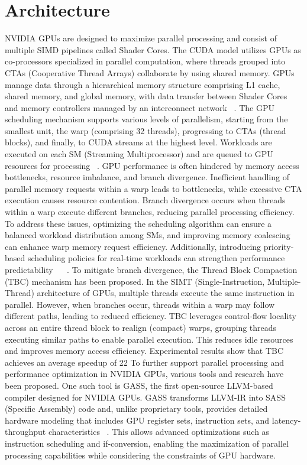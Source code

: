 \section{Architecture}
NVIDIA GPUs are designed to maximize parallel processing and consist of multiple SIMD pipelines called Shader Cores. The CUDA model utilizes GPUs as co-processors specialized in parallel computation, where threads grouped into CTAs (Cooperative Thread Arrays) collaborate by using shared memory. GPUs manage data through a hierarchical memory structure comprising L1 cache, shared memory, and global memory, with data transfer between Shader Cores and memory controllers managed by an interconnect network ~\cite{Bakhoda2009}. The GPU scheduling mechanism supports various levels of parallelism, starting from the smallest unit, the warp (comprising 32 threads), progressing to CTAs (thread blocks), and finally, to CUDA streams at the highest level. Workloads are executed on each SM (Streaming Multiprocessor) and are queued to GPU resources for processing ~\cite{Sanudo2020}.
GPU performance is often hindered by memory access bottlenecks, resource imbalance, and branch divergence. Inefficient handling of parallel memory requests within a warp leads to bottlenecks, while excessive CTA execution causes resource contention. Branch divergence occurs when threads within a warp execute different branches, reducing parallel processing efficiency. To address these issues, optimizing the scheduling algorithm can ensure a balanced workload distribution among SMs, and improving memory coalescing can enhance warp memory request efficiency. Additionally, introducing priority-based scheduling policies for real-time workloads can strengthen performance predictability ~\cite{Bakhoda2009} ~\cite{Sanudo2020}.
To mitigate branch divergence, the Thread Block Compaction (TBC) mechanism has been proposed. In the SIMT (Single-Instruction, Multiple-Thread) architecture of GPUs, multiple threads execute the same instruction in parallel. However, when branches occur, threads within a warp may follow different paths, leading to reduced efficiency. TBC leverages control-flow locality across an entire thread block to realign (compact) warps, grouping threads executing similar paths to enable parallel execution. This reduces idle resources and improves memory access efficiency. Experimental results show that TBC achieves an average speedup of 22%
To further support parallel processing and performance optimization in NVIDIA GPUs, various tools and research have been proposed. One such tool is GASS, the first open-source LLVM-based compiler designed for NVIDIA GPUs. GASS transforms LLVM-IR into SASS (Specific Assembly) code and, unlike proprietary tools, provides detailed hardware modeling that includes GPU register sets, instruction sets, and latency-throughput characteristics ~\cite{Yan2022}. This allows advanced optimizations such as instruction scheduling and if-conversion, enabling the maximization of parallel processing capabilities while considering the constraints of GPU hardware.
